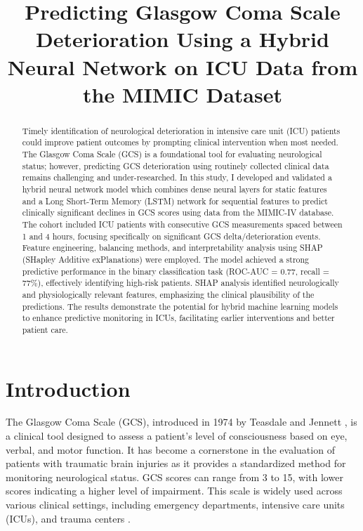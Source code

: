 \documentclass[conference]{IEEEtran}
\begin{document}
\title{Predicting Glasgow Coma Scale Deterioration Using a Hybrid Neural Network on ICU Data from the MIMIC Dataset}

\author{
}

\maketitle

\begin{abstract}
Timely identification of neurological deterioration in intensive care unit (ICU) patients could improve patient outcomes by prompting clinical intervention when most needed. The Glasgow Coma Scale (GCS) is a foundational tool for evaluating neurological status; however, predicting GCS deterioration using routinely collected clinical data remains challenging and under-researched. In this study, I developed and validated a hybrid neural network model which combines dense neural layers for static features and a Long Short-Term Memory (LSTM) network for sequential features to predict clinically significant declines in GCS scores using data from the MIMIC-IV database. The cohort included ICU patients with consecutive GCS measurements spaced between 1 and 4 hours, focusing specifically on significant GCS delta/deterioration events. Feature engineering, balancing methods, and interpretability analysis using SHAP (SHapley Additive exPlanations) were employed. The model achieved a strong predictive performance in the binary classification task (ROC-AUC = 0.77, recall = 77\%), effectively identifying high-risk patients. SHAP analysis identified neurologically  and physiologically relevant features, emphasizing the clinical plausibility of the predictions. The results demonstrate the potential for hybrid machine learning models to enhance predictive monitoring in ICUs, facilitating earlier interventions and better patient care.
\end{abstract}

\section{Introduction}

The Glasgow Coma Scale (GCS), introduced in 1974 by Teasdale and Jennett \cite{teasdale1974scale}, is a clinical tool designed to assess a patient's level of consciousness based on eye, verbal, and motor function. It has become a cornerstone in the evaluation of patients with traumatic brain injuries as it provides a standardized method for monitoring neurological status. GCS scores can range from 3 to 15, with lower scores indicating a higher level of impairment. This scale is widely used across various clinical settings, including emergency departments, intensive care units (ICUs), and trauma centers \cite{Jain2023gcs}.
\end{document}
